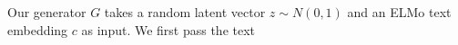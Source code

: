 Our generator $G$ takes a random latent vector $z \sim N(0, 1)$ and an ELMo text embedding $c$ as input. We first pass the text 